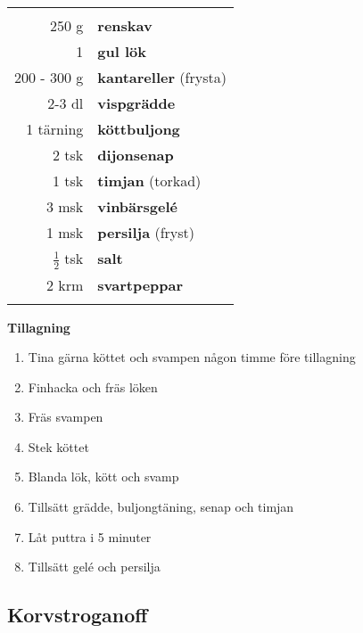 \begin{table}[H]
	\begin{tabular}{rl}
	\hline
	&\\
		250 g & \textbf{renskav}\\
		1 & \textbf{gul lök}\\
		200 - 300 g & \textbf{kantareller} (frysta)\\
		2-3 dl & \textbf{vispgrädde}\\
		1 tärning & \textbf{köttbuljong}\\
		2 tsk & \textbf{dijonsenap}\\
		1 tsk & \textbf{timjan} (torkad)\\
		3 msk & \textbf{vinbärsgelé}\\
		1 msk & \textbf{persilja} (fryst)\\
		$\frac{1}{2}$ tsk & \textbf{salt}\\
		2 krm & \textbf{svartpeppar}\\
	&\\
	\hline
	\end{tabular}
\end{table}


\begin{multicols*}{2}

\noindent \textbf{Tillagning}
\begin{enumerate}
	\itemsep0cm
	\item Tina gärna köttet och svampen någon timme före tillagning
	\item Finhacka och fräs löken
	\item Fräs svampen
	\item Stek köttet
	\item Blanda lök, kött och svamp
	\item Tillsätt grädde, buljongtäning, senap och timjan
	\item Låt puttra i 5 minuter
	\item Tillsätt gelé och persilja
\end{enumerate}

\end{multicols*}

\clearpage


\subsection{Korvstroganoff}

